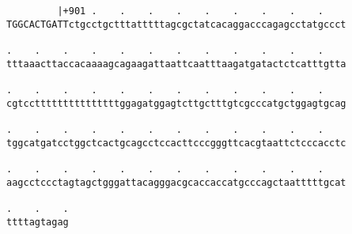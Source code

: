 \documentclass{article}
\begin{document}
\begin{Verbatim}
         |+901 .    .    .    .    .    .    .    .    .    
TGGCACTGATTctgcctgctttatttttagcgctatcacaggacccagagcctatgccct
                                                            
.    .    .    .    .    .    .    .    .    .    .    .    
tttaaacttaccacaaaagcagaagattaattcaatttaagatgatactctcatttgtta
                                                            
.    .    .    .    .    .    .    .    .    .    .    .    
cgtcctttttttttttttttggagatggagtcttgctttgtcgcccatgctggagtgcag
                                                            
.    .    .    .    .    .    .    .    .    .    .    .    
tggcatgatcctggctcactgcagcctccacttcccgggttcacgtaattctcccacctc
                                                            
.    .    .    .    .    .    .    .    .    .    .    .    
aagcctccctagtagctgggattacagggacgcaccaccatgcccagctaatttttgcat
                                                            
.    .    .
ttttagtagag
           
           
\end{Verbatim}
\end{document}
